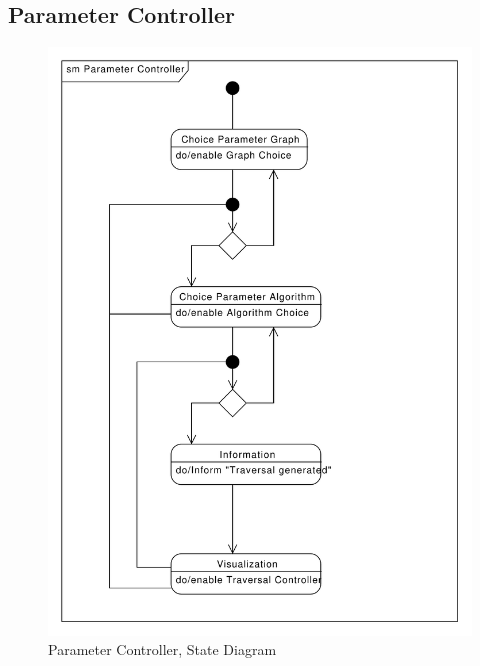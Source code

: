 \subsection{Parameter Controller}
\begin{figure}[p]
    \centering
    \includegraphics[width=\textwidth]{diagrams/sm-parameter-controller.pdf}
    \caption{Parameter Controller, State Diagram}
    \label{fig:sm-parameter-controller}
\end{figure}
% 
